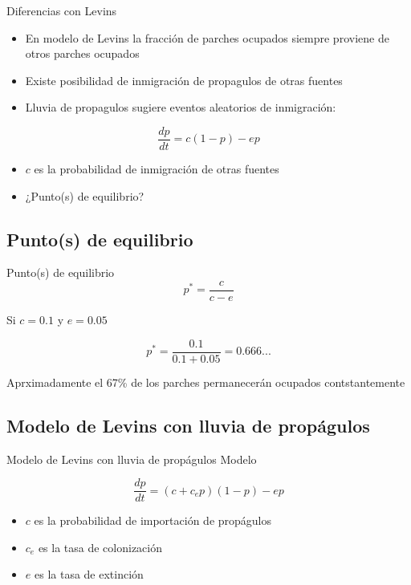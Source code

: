 \documentclass[
  11pt,
  ignorenonframetext,
]{beamer}
\begin{document}
\begin{frame}{Diferencias con Levins}
\begin{itemize}
\item
  En modelo de Levins la fracción de parches ocupados siempre proviene
  de otros parches ocupados
\item
  Existe posibilidad de inmigración de propagulos de otras fuentes
\item
  Lluvia de propagulos sugiere eventos aleatorios de inmigración:
\end{itemize}

\[\frac{dp}{dt} = c (1-p) - ep\]

\begin{itemize}
\item
  \(c\) es la probabilidad de inmigración de otras fuentes
\item
  ¿Punto(s) de equilibrio?
\end{itemize}
\end{frame}

\subsection{Punto(s) de equilibrio}\label{puntos-de-equilibrio-1}

\begin{frame}{Punto(s) de equilibrio}
\[p^* = \frac{c}{c-e}\]

Si \(c = 0.1\) y \(e = 0.05\)

\[p^* = \frac{0.1}{0.1+0.05} = 0.666...\]

Aprximadamente el 67\% de los parches permanecerán ocupados
contstantemente
\end{frame}

\subsection{Modelo de Levins con lluvia de
propágulos}\label{modelo-de-levins-con-lluvia-de-propuxe1gulos}

\begin{frame}{Modelo de Levins con lluvia de propágulos}
Modelo

\[\frac{dp}{dt} = (c + c_e p)(1-p) - ep\]

\begin{itemize}
\item
  \(c\) es la probabilidad de importación de propágulos
\item
  \(c_e\) es la tasa de colonización
\item
  \(e\) es la tasa de extinción
\end{itemize}
\end{frame}
\end{document}
